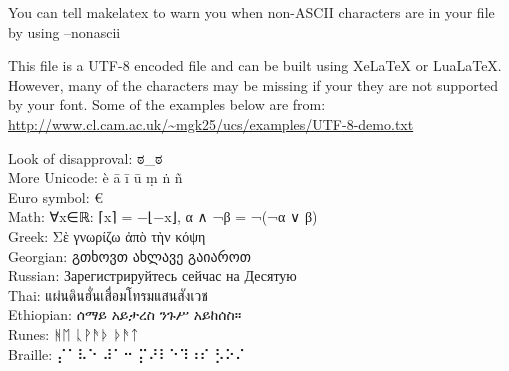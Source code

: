 \documentclass[letterpaper,12pt]{article}
\begin{document}
You can tell makelatex to warn you when non-ASCII characters are in your file by using --nonascii

This file is a UTF-8 encoded file and can be built using XeLaTeX or LuaLaTeX. However, many of the characters may be missing if your they are not supported by your font. Some of the examples below are from: \url{http://www.cl.cam.ac.uk/~mgk25/ucs/examples/UTF-8-demo.txt}

Look of disapproval: ಠ\_ಠ\\
More Unicode: è ā ī ū ṃ ṅ ñ\\
Euro symbol: €\\
Math: ∀x∈ℝ: ⌈x⌉ = −⌊−x⌋, α ∧ ¬β = ¬(¬α ∨ β)\\
Greek: Σὲ γνωρίζω ἀπὸ τὴν κόψη\\
Georgian: გთხოვთ ახლავე გაიაროთ\\
Russian: Зарегистрируйтесь сейчас на Десятую\\
Thai: แผ่นดินฮั่นเสื่อมโทรมแสนสังเวช\\
Ethiopian: ሰማይ አይታረስ ንጉሥ አይከሰስ።\\
Runes: ᚻᛖ ᚳᚹᚫᚦ ᚦᚫᛏ\\
Braille: ⡌⠁⠧⠑ ⠼⠁⠒  ⡍⠜⠇⠑⠹⠰⠎ ⡣⠕⠌\\
\end{document}
